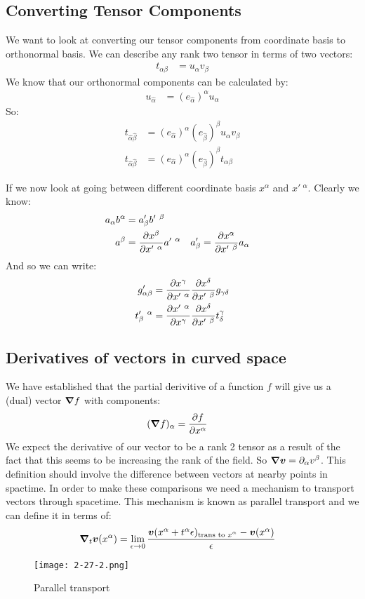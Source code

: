 \subsection{Converting Tensor Components}
We want to look at converting our tensor components from coordinate basis to orthonormal basis.
We can describe any rank two tensor in terms of two vectors:
\begin{align*}
	t_{\alpha\beta} &= u_\alpha v_\beta
\end{align*}
We know that our orthonormal components can be calculated by:
\begin{align*}
	u_{\hat{\alpha}} &= (e_{\hat{\alpha}})^\alpha u_\alpha
\end{align*}
So:
\begin{align*}
	t_{\hat{\alpha}\hat{\beta}} &= (e_{\hat{\alpha}})^\alpha (e_{\hat{\beta}})^\beta u_\alpha v_\beta \\
	t_{\hat{\alpha}\hat{\beta}} &= (e_{\hat{\alpha}})^\alpha (e_{\hat{\beta}})^\beta t_{\alpha\beta}
\end{align*}

If we now look at going between different coordinate basis $x^\alpha$ and $x'\ ^\alpha$. Clearly we know:
\begin{align*}
	a_\alpha b^\alpha &= a'_\beta b'\ ^\beta \\
	a^\beta &= \frac{\partial x^\beta}{\partial x'\ ^\alpha}a'\ ^\alpha & a'_\beta &= \frac{\partial x^\alpha}{\partial x'\ ^\beta}a_\alpha
\end{align*}
And so we can write:
\begin{align*}
	g'_{\alpha\beta} &= \partder{x^\gamma}{x'\ ^\alpha} \partder{x^\delta}{x'\ ^\beta} g_{\gamma\delta} \\
	t'_\beta\ ^\alpha &= \partder{x'\ ^\alpha}{x^\gamma}\partder{x^\delta}{x'\ ^\beta} t^\gamma_\delta
\end{align*}
\subsection{Derivatives of vectors in curved space}
We have established that the partial derivitive of a function $f$ will give us a (dual) vector $\bm{\nabla} f$ with components:
\begin{align*}
	(\bm{\nabla} f)_\alpha &= \frac{\partial f}{\partial x^\alpha}
\end{align*}
We expect the derivative of our vector to be a rank 2 tensor as a result of the fact that this seems to be increasing the rank of the field. So $\bm{\nabla}\bm{v} = \partial_\alpha v^\beta$.
This definition should involve the difference between vectors at nearby points in spactime. In order to make these comparisons we need a mechanism to transport vectors through spacetime.
This mechanism is known as parallel transport and we can define it in terms of:
\begin{align*}
	\bm{\nabla}_t \bm{v}(x^\alpha) &= \lim_{\epsilon\to0} \frac{\bm{v}(x^\alpha + t^\alpha\epsilon)_\text{trans to $x^\alpha$} - \bm{v}(x^\alpha)}{\epsilon}
\end{align*}
\begin{figure*}[h]
	\centering
	\texttt{[image: 2-27-2.png]}
	\caption*{Parallel transport}
\end{figure*}

